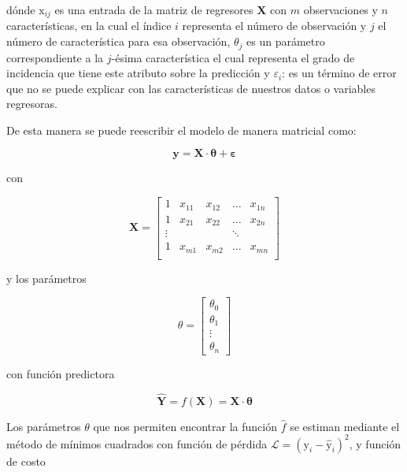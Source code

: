         dónde $\mathrm{x}_{i j}$ es una entrada de la matriz de regresores $\mathbf{X}$ con $m$ observaciones y $n$ características, en la cual el índice $i$ representa el número de observación y $j$ el número de característica para esa observación, $\theta_j$ es un parámetro correspondiente a la $j$-ésima característica el cual representa el grado de incidencia que tiene este atributo sobre la predicción y $\varepsilon_i$: es un término de error que no se puede explicar con las características de nuestros datos o variables regresoras.
        
        \noindent De esta manera se puede reescribir el modelo de manera matricial como:
        
        \begin{equation}
            \mathbf{y} = \mathbf{X}\cdot\mathbf{\theta} + \mathbf{\varepsilon}\label{eq:3}
        \end{equation}
        
        \noindent con
        
        $$\mathbf{X} = \begin{bmatrix}
                        1 & x_{11} & x_{12} & \dots & x_{1n}\\
                        1 & x_{21} & x_{22} & \dots & x_{2n}\\
                        \vdots & & & \ddots & \\
                        1 & x_{m1} & x_{m2} & \dots & x_{mn}\\
                        \end{bmatrix}$$
        
        \noindent y los parámetros
        
        $$\theta = \begin{bmatrix}
                    \theta_0\\
                    \theta_1\\
                    \vdots\\
                    \theta_n
                    \end{bmatrix}$$
                    
        \noindent con función predictora
        
        \begin{equation}
            \mathbf{\hat{Y}} = f(\mathbf{X}) = \mathbf{X}\cdot\mathbf{\theta}
        \end{equation}
        
        Los parámetros $\theta$ que nos permiten encontrar la función $\hat{f}$ se estiman mediante el método de mínimos cuadrados con función de pérdida $\mathcal{L} =  (\mathrm{y}_i - \mathrm{\hat{y}}_i)^2$, y función de costo
        
